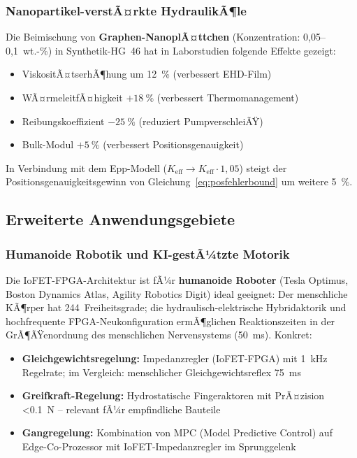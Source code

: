 ﻿\documentclass[a4paper,12pt]{scrreprt}
\theoremstyle{definition}
\begin{document}
\subsubsection{Nanopartikel-verstÃ¤rkte HydraulikÃ¶le}

Die Beimischung von \textbf{Graphen-NanoplÃ¤ttchen}
(Konzentration: 0{,}05--0{,}1~wt.-\%) in Synthetik-HG~46
hat in Laborstudien folgende Effekte gezeigt:
\begin{itemize}
  \item ViskositÃ¤tserhÃ¶hung um \SI{12}{\percent} (verbessert EHD-Film)
  \item WÃ¤rmeleitfÃ¤higkeit $+\SI{18}{\percent}$ (verbessert Thermomanagement)
  \item Reibungskoeffizient $-\SI{25}{\percent}$ (reduziert PumpverschleiÃŸ)
  \item Bulk-Modul $+\SI{5}{\percent}$ (verbessert Positionsgenauigkeit)
\end{itemize}
In Verbindung mit dem Epp-Modell ($K_{\text{eff}} \to K_{\text{eff}} \cdot 1{,}05$)
steigt der Positionsgenauigkeitsgewinn von Gleichung~\eqref{eq:posfehlerbound}
um weitere \SI{5}{\percent}.

\subsection{Erweiterte Anwendungsgebiete}

\subsubsection{Humanoide Robotik und KI-gestÃ¼tzte Motorik}

Die IoFET-FPGA-Architektur ist fÃ¼r \textbf{humanoide Roboter}
(Tesla Optimus, Boston Dynamics Atlas, Agility Robotics Digit)
ideal geeignet: Der menschliche KÃ¶rper hat 244~Freiheitsgrade;
die hydraulisch-elektrische Hybridaktorik und hochfrequente
FPGA-Neukonfiguration ermÃ¶glichen Reaktionszeiten in
der GrÃ¶ÃŸenordnung des menschlichen Nervensystems (\SI{50}{\milli\second}).
Konkret:
\begin{itemize}
  \item \textbf{Gleichgewichtsregelung:} Impedanzregler (IoFET-FPGA)
        mit \SI{1}{\kilo\hertz} Regelrate; im Vergleich: menschlicher
        Gleichgewichtsreflex \SI{75}{\milli\second}
  \item \textbf{Greifkraft-Regelung:} Hydrostatische Fingeraktoren
        mit PrÃ¤zision \SI{<0.1}{\newton} -- relevant fÃ¼r empfindliche
        Bauteile
  \item \textbf{Gangregelung:} Kombination von MPC (Model Predictive
        Control) auf Edge-Co-Prozessor mit IoFET-Impedanzregler
        im Sprunggelenk
\end{itemize}
\end{document}

